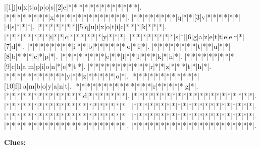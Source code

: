 \documentclass{article}
\begin{document}
\begin{Puzzle}{22}{22}
|[1]j|u|x|t|a|p|o|s|[2]e|*|*|*|*|*|*|*|*|*|*|*|*|*|.
|*|*|*|*|*|*|*|*|x|*|*|*|*|*|*|*|*|*|*|*|*|*|.
|*|*|*|*|*|*|*|*|q|*|*|[3]v|*|*|*|*|*|*|[4]s|*|*|*|.
|*|*|*|*|*|*|*|[5]q|u|i|x|o|t|i|c|*|*|*|k|*|*|*|.
|*|*|*|*|*|*|*|*|i|*|*|c|*|*|*|*|*|*|y|*|*|*|.
|*|*|*|*|*|*|*|*|s|*|[6]g|a|z|e|t|t|e|e|r|*|[7]d|*|.
|*|*|*|*|*|*|*|*|i|*|*|b|*|*|*|*|*|*|o|*|i|*|.
|*|*|*|*|*|*|*|*|t|*|*|u|*|*|[8]b|*|*|*|c|*|p|*|.
|*|*|*|*|*|*|*|*|e|*|*|l|*|*|l|*|*|*|k|*|h|*|.
|*|*|*|*|*|*|*|*|*|[9]c|h|a|m|p|i|o|n|*|e|*|t|*|.
|*|*|*|*|*|*|*|*|*|*|*|r|*|*|z|*|*|*|t|*|h|*|.
|*|*|*|*|*|*|*|*|*|*|*|y|*|*|z|*|*|*|*|*|o|*|.
|*|*|*|*|*|*|*|*|*|*|*|*|[10]f|l|a|m|b|o|y|a|n|t|.
|*|*|*|*|*|*|*|*|*|*|*|*|*|*|r|*|*|*|*|*|g|*|.
|*|*|*|*|*|*|*|*|*|*|*|*|*|*|d|*|*|*|*|*|*|*|.
|*|*|*|*|*|*|*|*|*|*|*|*|*|*|*|*|*|*|*|*|*|*|.
|*|*|*|*|*|*|*|*|*|*|*|*|*|*|*|*|*|*|*|*|*|*|.
|*|*|*|*|*|*|*|*|*|*|*|*|*|*|*|*|*|*|*|*|*|*|.
|*|*|*|*|*|*|*|*|*|*|*|*|*|*|*|*|*|*|*|*|*|*|.
|*|*|*|*|*|*|*|*|*|*|*|*|*|*|*|*|*|*|*|*|*|*|.
|*|*|*|*|*|*|*|*|*|*|*|*|*|*|*|*|*|*|*|*|*|*|.
|*|*|*|*|*|*|*|*|*|*|*|*|*|*|*|*|*|*|*|*|*|*|.
\end{Puzzle}
\begin{PuzzleClues}{\textbf{Clues:}\\}
\noindent{} \\ 
 \\ 
 \\ 
 \\ 
 \\ 
 \\ 
 \\ 
 \\ 
 \\ 
 \\ 
\end{PuzzleClues}
\end{document}
